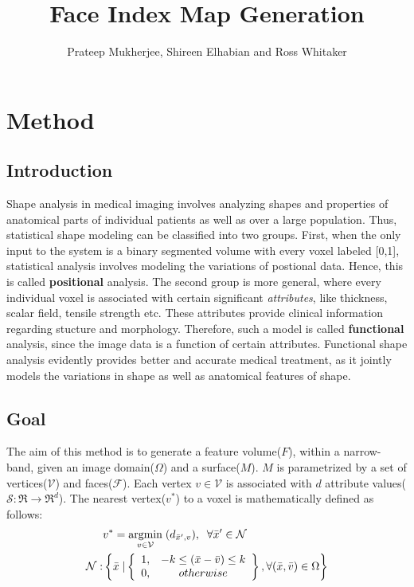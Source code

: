 \documentclass[11pt]{article}
\title{Face Index Map Generation}
\author{Prateep Mukherjee, Shireen Elhabian and Ross Whitaker}
\newcommand{\Ff}{\mathcal{F}}
\newcommand{\Vv}{\mathcal{V}}
\newcommand{\argmin}{\operatornamewithlimits{argmin}}
\begin{document}
\maketitle
\makenomenclature
\section{Method}

 \subsection{Introduction} 
 Shape analysis in medical imaging involves analyzing shapes and properties of anatomical parts of individual patients as well as over a large population. Thus, statistical shape modeling can be classified into two groups. First, when the only input to the system is a binary segmented volume with every voxel labeled [0,1], statistical analysis involves modeling the variations of postional data. Hence, this is called \textbf{positional} analysis. The second group is more general, where every individual voxel is associated with certain significant \emph{attributes}, like thickness, scalar field, tensile strength etc. These attributes provide clinical information regarding stucture and morphology. Therefore, such a model is called \textbf{functional} analysis, since the image data is a function of certain attributes. Functional shape analysis evidently provides better and accurate medical treatment, as it jointly models the variations in shape as well as anatomical features of shape. 

 \subsection{Goal} 
 The aim of this method is to generate a feature volume($F$), within a narrow-band, given an image domain($\Omega$) and a surface($M$). $M$ is parametrized by a set of vertices($\Vv$) and faces($\Ff$). Each vertex $v \in \Vv$  is associated with $d$ attribute values($\mathcal{S} : \Re \rightarrow \Re^{d}$). The nearest vertex($v^{*}$) to a voxel is mathematically defined as follows:
  \begin{eqnarray*}
		   &v^{*} = \argmin\limits_{v \in \mathcal{V}} \; (d_{\bar{x}',v}), \; \; \forall \bar{x}' \in \mathcal{N} \\
          \mathcal{N} :& \left\{ \bar{x} \; |
         				  \left\{ \begin{array}{cc}
		                   1, & \mbox{$-k \le (\bar{x} - \bar{v}) \le k$} \\
        				   0, & otherwise
         \end{array} \right\} , \forall (\bar{x},\bar{v}) \in \Omega
         \right\}
  \end{eqnarray*}
 
\end{document}
